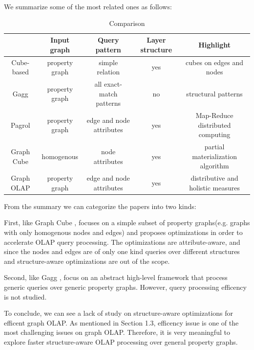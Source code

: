 We summarize some of the most related ones as follows:
 \begin{table}
 	\small
 \begin{center}
 	\begin{tabular}{ | c | c | c | c | c |  } 
 		\hline 
 		 & Input graph & Query pattern & Layer structure & Highlight\\ \hline 
 		 Cube-based \cite{DBLP:conf/sofsem/JakawatFL16} & property graph & simple relation & yes & cubes on edges and nodes\\ \hline 
 		 Gagg \cite{DBLP:conf/esws/MaaliCD15} & property graph & all exact-match patterns & no & structural patterns\\ \hline 
 		 Pagrol \cite{DBLP:conf/icde/WangFWTAA14} & property graph & edge and node attributes & yes & Map-Reduce distributed computing\\ \hline 
 		 Graph Cube \cite{DBLP:conf/sigmod/ZhaoLXH11} & homogenous  & node attributes & yes & partial materialization algorithm\\ \hline 
 		 Graph OLAP \cite{DBLP:conf/icdm/ChenYZHY08} & property graph & edge and node attributes & yes & distributive and holistic measures\\ \hline 
 		 
 	\end{tabular}
 	\end {center}
 	\caption{Comparison }
\end{table}
 
 
From the summary we can categorize the papers into two kinds: 
 
First, like Graph Cube \cite{DBLP:conf/sigmod/ZhaoLXH11}, focuses on a simple subset of property graphs(e.g. graphs with only homogenous nodes and edges) and proposes optimizations in order to accelerate OLAP query processing. The optimizations are attribute-aware, and since the nodes and edges are of only one kind queries over different structures and structure-aware optimizations are out of the scope. 
 
Second, like Gagg \cite{DBLP:conf/esws/MaaliCD15}, focus on an abstract high-level framework that process generic queries over generic property graphs. However, query processing efficency is not studied.  
 
To conclude, we can see a lack of study on structure-aware optimizations for efficent graph OLAP. As mentioned in Section 1.3, efficency issue is one of the most challenging issues on graph OLAP. Therefore, it is very meaningful to explore faster structure-aware OLAP processing over general property graphs.



